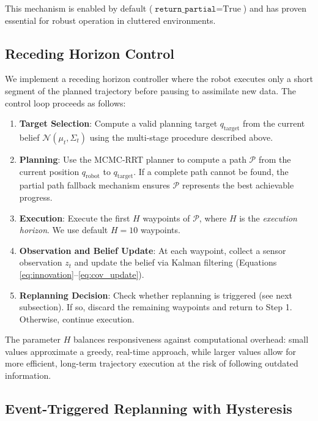 This mechanism is enabled by default ($\texttt{return\_partial} = \text{True}$) and has proven essential for robust operation in cluttered environments.

\subsection{Receding Horizon Control}

We implement a receding horizon controller where the robot executes only a short segment of the planned trajectory before pausing to assimilate new data. The control loop proceeds as follows:

\begin{enumerate}
    \item \textbf{Target Selection}: Compute a valid planning target $q_{\text{target}}$ from the current belief $\mathcal{N}(\mu_t, \Sigma_t)$ using the multi-stage procedure described above.

    \item \textbf{Planning}: Use the MCMC-RRT planner to compute a path $\mathcal{P}$ from the current position $q_{\text{robot}}$ to $q_{\text{target}}$. If a complete path cannot be found, the partial path fallback mechanism ensures $\mathcal{P}$ represents the best achievable progress.

    \item \textbf{Execution}: Execute the first $H$ waypoints of $\mathcal{P}$, where $H$ is the \emph{execution horizon}. We use default $H = 10$ waypoints.

    \item \textbf{Observation and Belief Update}: At each waypoint, collect a sensor observation $z_t$ and update the belief via Kalman filtering (Equations \ref{eq:innovation}--\ref{eq:cov_update}).

    \item \textbf{Replanning Decision}: Check whether replanning is triggered (see next subsection). If so, discard the remaining waypoints and return to Step 1. Otherwise, continue execution.
\end{enumerate}

The parameter $H$ balances responsiveness against computational overhead: small values approximate a greedy, real-time approach, while larger values allow for more efficient, long-term trajectory execution at the risk of following outdated information.

\subsection{Event-Triggered Replanning with Hysteresis}

